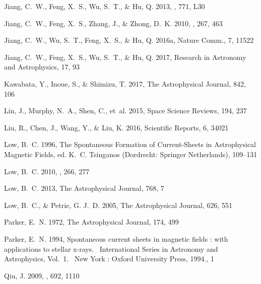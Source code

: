 \documentclass[twocolumn]{aastex6} %
\begin{document}
\begin{CJK*}{UTF8}{gbsn}
\begin{thebibliography}{}
Jiang, C.~W., Feng, X.~S., Wu, S.~T., \& Hu, Q. 2013, \apjl, 771, L30

Jiang, C.~W., Feng, X.~S., Zhang, J., \& Zhong, D.~K. 2010, \solphys, 267, 463

{Jiang}, C.~W., {Wu}, S.~T., {Feng}, X.~S., \& {Hu}, Q. 2016a, Nature Comm., 7,
  11522

{Jiang}, C.~W., {Feng}, X.~S., {Wu}, S.~T., \& {Hu}, Q. 2017, Research in Astronomy and Astrophysics, 17, 93

Kawabata, Y., Inoue, S., \& Shimizu, T. 2017, The Astrophysical Journal, 842,
  106

Lin, J., Murphy, N.~A., Shen, C., {et~al.} 2015, Space Science Reviews, 194,
  237

Liu, R., Chen, J., Wang, Y., \& Liu, K. 2016, Scientific Reports, 6, 34021

Low, B.~C. 1996, The Spontaneous Formation of Current-Sheets in Astrophysical
  Magnetic Fields, ed. K.~C. Tsinganos (Dordrecht: Springer Netherlands),
  109--131

{Low}, B.~C. 2010, \solphys, 266, 277

Low, B.~C. 2013, The Astrophysical Journal, 768, 7

Low, B.~C., \& Petrie, G. J.~D. 2005, The Astrophysical Journal, 626, 551

Parker, E.~N. 1972, The Astrophysical Journal, 174, 499

{Parker}, E.~N. 1994, Spontaneous current sheets in magnetic fields : with
  applications to stellar x-rays.~ International Series in Astronomy and
  Astrophysics, Vol.~1.~ New York : Oxford University Press, 1994., 1

{Qiu}, J. 2009, \apj, 692, 1110




\end{thebibliography}
\end{CJK*}
\end{document}
